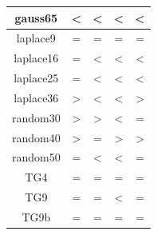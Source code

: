 \documentclass[fleqn,10pt]{SelfArx} %
\begin{document}
\begin{table}[]
\begin{tabular}{c|c|c|c|c|}
\multicolumn{1}{|c|}{gauss65}        & \cellcolor[HTML]{B7E1CD}\textless{}    & \cellcolor[HTML]{B7E1CD}\textless{}    & \cellcolor[HTML]{B7E1CD}\textless{}    & \cellcolor[HTML]{B7E1CD}\textless{}    \\ \hline
\multicolumn{1}{|c|}{laplace9}       & =                                      & =                                      & =                                      & =                                      \\ \hline
\multicolumn{1}{|c|}{laplace16}      & =                                      & \cellcolor[HTML]{B7E1CD}\textless{}    & \cellcolor[HTML]{B7E1CD}\textless{}    & \cellcolor[HTML]{B7E1CD}\textless{}    \\ \hline
\multicolumn{1}{|c|}{laplace25}      & =                                      & \cellcolor[HTML]{B7E1CD}\textless{}    & \cellcolor[HTML]{B7E1CD}\textless{}    & \cellcolor[HTML]{B7E1CD}\textless{}    \\ \hline
\multicolumn{1}{|c|}{laplace36}      & \cellcolor[HTML]{F4C7C3}\textgreater{} & \cellcolor[HTML]{B7E1CD}\textless{}    & \cellcolor[HTML]{B7E1CD}\textless{}    & \cellcolor[HTML]{F4C7C3}\textgreater{} \\ \hline
\multicolumn{1}{|c|}{random30}       & \cellcolor[HTML]{F4C7C3}\textgreater{} & \cellcolor[HTML]{F4C7C3}\textgreater{} & \cellcolor[HTML]{B7E1CD}\textless{}    & =                                      \\ \hline
\multicolumn{1}{|c|}{random40}       & \cellcolor[HTML]{F4C7C3}\textgreater{} & =                                      & \cellcolor[HTML]{F4C7C3}\textgreater{} & \cellcolor[HTML]{F4C7C3}\textgreater{} \\ \hline
\multicolumn{1}{|c|}{random50}       & =                                      & \cellcolor[HTML]{B7E1CD}\textless{}    & \cellcolor[HTML]{B7E1CD}\textless{}    & =                                      \\ \hline
\multicolumn{1}{|c|}{TG4}            & =                                      & =                                      & =                                      & =                                      \\ \hline
\multicolumn{1}{|c|}{TG9}            & =                                      & =                                      & \cellcolor[HTML]{B7E1CD}\textless{}    & =                                      \\ \hline
\multicolumn{1}{|c|}{TG9b}           & =                                      & =                                      & =                                      & =                                      \\ \hline

\end{tabular}
\end{table}
\end{document}
